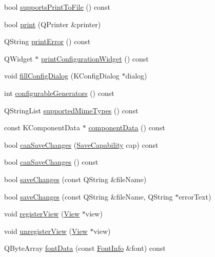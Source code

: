 \begin{DoxyCompactItemize}
\item 
bool \hyperlink{classOkular_1_1Document_a0473f147390527d99a898bf3d99218b8}{supports\+Print\+To\+File} () const 
\item 
bool \hyperlink{classOkular_1_1Document_a122291e23a4ba2fc7750ca0e81eb4796}{print} (Q\+Printer \&printer)
\item 
Q\+String \hyperlink{classOkular_1_1Document_a585768ca7f9436edb0260c9682d94464}{print\+Error} () const 
\item 
Q\+Widget $\ast$ \hyperlink{classOkular_1_1Document_acf0fed7059a1b6c96a674074d1b92ffc}{print\+Configuration\+Widget} () const 
\item 
void \hyperlink{classOkular_1_1Document_a38ad86fc7b26c7d46db2b2be5893e615}{fill\+Config\+Dialog} (K\+Config\+Dialog $\ast$dialog)
\item 
int \hyperlink{classOkular_1_1Document_aba6f8ba249dbd346e8d34a1a31393917}{configurable\+Generators} () const 
\item 
Q\+String\+List \hyperlink{classOkular_1_1Document_a7bfda48f95d3e152b9d66fc8968ae12e}{supported\+Mime\+Types} () const 
\item 
const K\+Component\+Data $\ast$ \hyperlink{classOkular_1_1Document_a31fa703bff8a2ac06d9f296cf12efc5a}{component\+Data} () const 
\item 
bool \hyperlink{classOkular_1_1Document_a46772ecd6dc23f6e07fb358eef32924d}{can\+Save\+Changes} (\hyperlink{classOkular_1_1Document_a7aa93fc147bd5aa966d65477b5c5eae9}{Save\+Capability} cap) const 
\item 
bool \hyperlink{classOkular_1_1Document_a0372c1139a49d2efd2fa140326a9c37d}{can\+Save\+Changes} () const 
\item 
bool \hyperlink{classOkular_1_1Document_ac3e0b31133ab8ef36bb95038c8f93380}{save\+Changes} (const Q\+String \&file\+Name)
\item 
bool \hyperlink{classOkular_1_1Document_a1440b26721585658914765294039f350}{save\+Changes} (const Q\+String \&file\+Name, Q\+String $\ast$error\+Text)
\item 
void \hyperlink{classOkular_1_1Document_a92956a4adc2ebbf3c346204655e2a8a1}{register\+View} (\hyperlink{classOkular_1_1View}{View} $\ast$view)
\item 
void \hyperlink{classOkular_1_1Document_a16aedf5b18ed8216350979ae9e9dd72f}{unregister\+View} (\hyperlink{classOkular_1_1View}{View} $\ast$view)
\item 
Q\+Byte\+Array \hyperlink{classOkular_1_1Document_a88f3b8dadee061c537ff9eb28d1c3257}{font\+Data} (const \hyperlink{classOkular_1_1FontInfo}{Font\+Info} \&font) const 

\end{DoxyCompactItemize}
